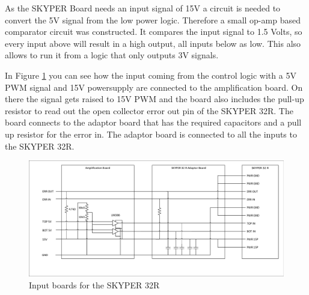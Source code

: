 As the SKYPER Board needs an input signal of 15V a circuit is needed to convert the 5V signal from the low power logic.
Therefore a small op-amp based comparator circuit was constructed.
It compares the input signal to 1.5 Volts, so every input above will result in a high output,
all inputs below as low.
This also allows to run it from a logic that only outputs 3V signals.

In Figure \ref{fig:Skyper32in} you can see how the input coming from the control logic with a 5V PWM signal and 15V powersupply are connected to the amplification board.
On there the signal gets raised to 15V PWM and the board also includes the pull-up resistor to read out the open collector error out pin of the SKYPER 32R. The board connects to the adaptor board that has the required capacitors and a pull up resistor for the error in. The adaptor board is connected to all the inputs to the SKYPER 32R.

\begin{figure}[H]
   \centering
   \includegraphics[width=\textwidth]{figures/Skyperboard/Skyper32in.pdf}
    \caption{Input boards for the SKYPER 32R}
	\label{fig:Skyper32in}
\end{figure}